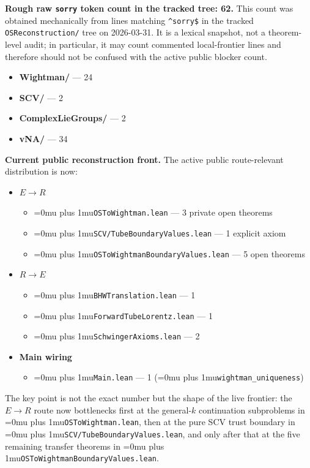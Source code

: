 \documentclass[11pt,a4paper]{article}
\newcommand{\sorry}{\texttt{sorry}}
\newcommand{\leanfile}[1]{\begingroup\Urlmuskip=0mu plus 1mu\relax\nolinkurl{#1}\endgroup}
\newcommand{\leanname}[1]{\begingroup\Urlmuskip=0mu plus 1mu\relax\nolinkurl{#1}\endgroup}
\begin{document}
\textbf{Rough raw \sorry{} token count in the tracked tree: 62.}
This count was obtained mechanically from lines matching
\texttt{\string^\string\s*sorry\$} in the tracked \texttt{OSReconstruction/}
tree on 2026-03-31. It is a lexical snapshot, not a theorem-level audit; in
particular, it may count commented local-frontier lines and therefore should not
be confused with the active public blocker count.

\begin{itemize}
\item \textbf{Wightman/} --- 24
\item \textbf{SCV/} --- 2
\item \textbf{ComplexLieGroups/} --- 2
\item \textbf{vNA/} --- 34
\end{itemize}

\textbf{Current public reconstruction front.}
The active public route-relevant distribution is now:
\begin{itemize}
\item \textbf{$E \to R$}
  \begin{itemize}
  \item \leanfile{OSToWightman.lean} --- 3 private open theorems
  \item \leanfile{SCV/TubeBoundaryValues.lean} --- 1 explicit axiom
  \item \leanfile{OSToWightmanBoundaryValues.lean} --- 5 open theorems
  \end{itemize}
\item \textbf{$R \to E$}
  \begin{itemize}
  \item \leanfile{BHWTranslation.lean} --- 1
  \item \leanfile{ForwardTubeLorentz.lean} --- 1
  \item \leanfile{SchwingerAxioms.lean} --- 2
  \end{itemize}
\item \textbf{Main wiring}
  \begin{itemize}
  \item \leanfile{Main.lean} --- 1 (\leanname{wightman\_uniqueness})
  \end{itemize}
\end{itemize}

\noindent
The key point is not the exact number but the shape of the live frontier:
the $E \to R$ route now bottlenecks first at the general-$k$ continuation
subproblems in \leanfile{OSToWightman.lean}, then at the pure SCV trust
boundary in \leanfile{SCV/TubeBoundaryValues.lean}, and only after that at the
five remaining transfer theorems in
\leanfile{OSToWightmanBoundaryValues.lean}.
\end{document}
